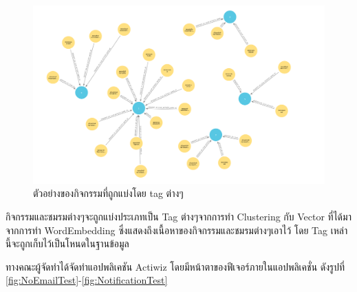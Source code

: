\documentclass[14pt,oneside,openright,a4paper]{cpe-thai-project}
\begin{document}
\begin{figure}[!h]\centering
  \includegraphics[width=12cm]{./Pictures/tag.png}
  \caption{ตัวอย่างของกิจกรรมที่ถูกแบ่งโดย tag ต่างๆ}\label{fig:Tag}
\end{figure}
  \hspace*{1cm} กิจกรรมและชมรมต่างๆจะถูกแบ่งประเภทเป็น Tag ต่างๆจากการทำ Clustering กับ Vector ที่ได้มาจากการทำ WordEmbedding ซึ่งแสดงถึงเนื้อหาของกิจกรรมและชมรมต่างๆเอาไว้ โดย Tag เหล่านี้จะถูกเก็บไว้เป็นโหนดในฐานข้อมูล


\hspace*{1cm} ทางคณะผู้จัดทำได้จัดทำแอปพลิเคชัน Actiwiz โดยมีหน้าตาของฟีเจอร์ภายในแอปพลิเคชั่น ดังรูปที่ \ref{fig:NoEmailTest}-\ref{fig:NotificationTest}
\end{document}
